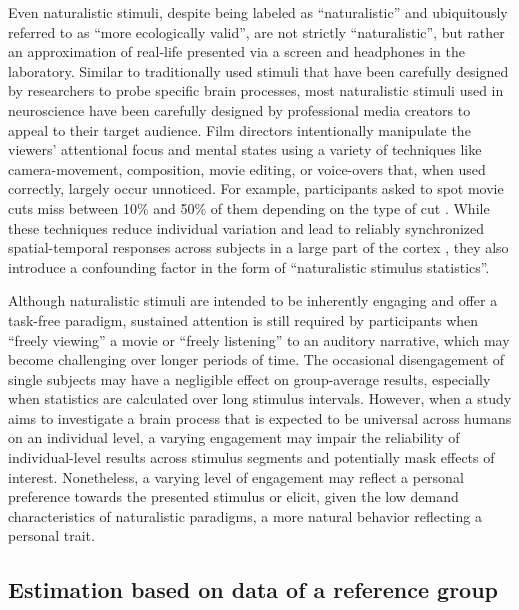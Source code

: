 %
Even naturalistic stimuli, despite being labeled as ``naturalistic'' and
ubiquitously referred to as ``more ecologically valid'', are not strictly
``naturalistic'', but rather an approximation of real-life presented via a
screen and headphones in the laboratory.
Similar to traditionally used stimuli that have been carefully designed by
researchers to probe specific brain processes, most naturalistic stimuli used in
neuroscience have been carefully designed by professional media creators to
appeal to their target audience.
%
Film directors intentionally manipulate the viewers' attentional focus and
mental states using a variety of techniques like camera-movement, composition,
movie editing, or voice-overs \citep{brown2012cinematography,
dancyger2011film-technique, katz1991film, mercado2011filmmakers} that, when used
correctly, largely occur unnoticed.
%
For example, participants asked to spot movie cuts miss between 10\% and 50\% of
them depending on the type of cut \citep{smith2008edit}.
%
While these techniques reduce individual variation and lead to reliably
synchronized spatial-temporal responses across subjects in a large part of the
cortex \citep{hasson2008neurocinematics}, they also introduce a confounding
factor in the form of ``naturalistic stimulus statistics''.

%
Although naturalistic stimuli are intended to be inherently engaging and offer a
task-free paradigm, sustained attention is still required by participants when
``freely viewing'' a movie or ``freely listening'' to an auditory narrative,
which may become challenging over longer periods of time.
%
The occasional disengagement of single subjects may have a negligible effect on
group-average results, especially when statistics are calculated over long
stimulus intervals.
%
However, when a study aims to investigate a brain process that is expected to be
universal across humans on an individual level, a varying engagement may impair
the reliability of individual-level results across stimulus segments and
potentially mask effects of interest.
%
Nonetheless, a varying level of engagement may reflect a personal preference
towards the presented stimulus or elicit, given the low demand characteristics
\citep[cf.][]{orne1962social} of naturalistic paradigms, a more natural behavior
reflecting a personal trait.


\subsection{Estimation based on data of a reference group}

